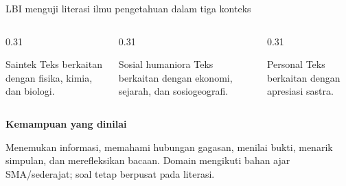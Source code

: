 \begin{frame}{LBI menguji literasi ilmu pengetahuan dalam tiga konteks}
  \begin{columns}[T,onlytextwidth]
    \begin{column}{0.31\textwidth}
      \begin{block}{Saintek}
        Teks berkaitan dengan fisika, kimia, dan biologi.
      \end{block}
    \end{column}
    \begin{column}{0.31\textwidth}
      \begin{block}{Sosial humaniora}
        Teks berkaitan dengan ekonomi, sejarah, dan sosiogeografi.
      \end{block}
    \end{column}
    \begin{column}{0.31\textwidth}
      \begin{block}{Personal}
        Teks berkaitan dengan apresiasi sastra.
      \end{block}
    \end{column}
  \end{columns}
  \vspace{0.20cm}
  {\color{StudentBlue}\bfseries Kemampuan yang dinilai}\par
  \vspace{0.05cm}
  {\fontsize{11.5}{14.3}\selectfont Menemukan informasi, memahami hubungan gagasan, menilai bukti, menarik simpulan, dan merefleksikan bacaan.}
  \vspace{0.12cm}
  {\color{StudentGray}\fontsize{9.8}{12}\selectfont Domain mengikuti bahan ajar SMA/sederajat; soal tetap berpusat pada literasi.}
\end{frame}

